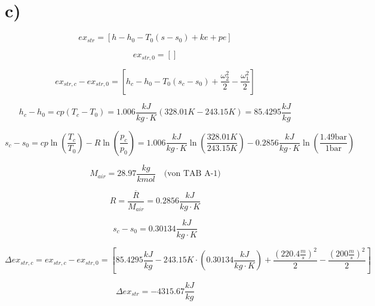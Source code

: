 

\section*{c)}

\[
ex_{str} = \left[ h - h_0 - T_0 (s - s_0) + ke + pe \right]
\]

\[
ex_{str,0} = \left[ \right]
\]

\[
ex_{str,c} - ex_{str,0} = \left[ h_c - h_0 - T_0 (s_c - s_0) + \frac{\omega_2^2}{2} - \frac{\omega_1^2}{2} \right]
\]

\[
h_c - h_0 = cp \left( T_c - T_0 \right) = 1.006 \frac{kJ}{kg \cdot K} \left( 328.01K - 243.15K \right) = 85.4295 \frac{kJ}{kg}
\]

\[
s_c - s_0 = cp \ln \left( \frac{T_c}{T_0} \right) - R \ln \left( \frac{p_c}{p_0} \right) = 1.006 \frac{kJ}{kg \cdot K} \ln \left( \frac{328.01K}{243.15K} \right) - 0.2856 \frac{kJ}{kg \cdot K} \ln \left( \frac{1.49 \text{bar}}{1 \text{bar}} \right)
\]

\[
M_{air} = 28.97 \frac{kg}{kmol} \quad \text{(von TAB A-1)}
\]

\[
R = \frac{\overline{R}}{M_{air}} = 0.2856 \frac{kJ}{kg \cdot K}
\]

\[
s_c - s_0 = 0.30134 \frac{kJ}{kg \cdot K}
\]

\[
\Delta ex_{str,c} = ex_{str,c} - ex_{str,0} = \left[ 85.4295 \frac{kJ}{kg} - 243.15K \cdot (0.30134 \frac{kJ}{kg \cdot K}) + \frac{(220.4 \frac{m}{s})^2}{2} - \frac{(200 \frac{m}{s})^2}{2} \right]
\]

\[
\Delta ex_{str} = -4315.67 \frac{kJ}{kg}
\]